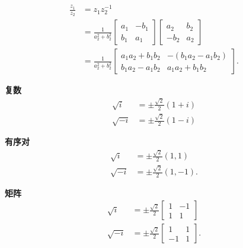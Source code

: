 \begin{tcolorbox}[breakable, enhanced, title = {商}]
  $$
    \begin{aligned}
      \frac{z_{1}}{z_{2}} & =z_{1} z_{2}^{-1}                                                                                              \\
                          & =\frac{1}{a_{2}^{2}+b_{2}^{2}}\left[\begin{array}{cc}
          a_{1} & -b_{1} \\
          b_{1} & a_{1}
        \end{array}\right]\left[\begin{array}{cc}
          a_{2}  & b_{2} \\
          -b_{2} & a_{2}
        \end{array}\right] \\
                          & =\frac{1}{a_{2}^{2}+b_{2}^{2}}\left[\begin{array}{ll}
          a_{1} a_{2}+b_{1} b_{2} & -\left(b_{1} a_{2}-a_{1} b_{2}\right) \\
          b_{1} a_{2}-a_{1} b_{2} & a_{1} a_{2}+b_{1} b_{2}
        \end{array}\right] .
    \end{aligned}
  $$
\end{tcolorbox}

\begin{tcolorbox}[breakable, enhanced, title = {\boldmath $\pm i$的平方根}]
  \textbf{复数}
  $$
    \begin{aligned}
      \sqrt{i}  & = \pm \frac{\sqrt{2}}{2}(1+i) \\
      \sqrt{-i} & = \pm \frac{\sqrt{2}}{2}(1-i)
    \end{aligned}
  $$

  \textbf{有序对}
  $$
    \begin{aligned}
      \sqrt{i}  & = \pm \frac{\sqrt{2}}{2}(1,1)    \\
      \sqrt{-i} & = \pm \frac{\sqrt{2}}{2}(1,-1) .
    \end{aligned}
  $$

  \textbf{矩阵}
  $$
    \begin{aligned}
      \sqrt{i}  & = \pm \frac{\sqrt{2}}{2}\left[\begin{array}{cc}
          1 & -1 \\
          1 & 1
        \end{array}\right]   \\
      \sqrt{-i} & = \pm \frac{\sqrt{2}}{2}\left[\begin{array}{cc}
          1  & 1 \\
          -1 & 1
        \end{array}\right] .
    \end{aligned}
  $$
\end{tcolorbox}



